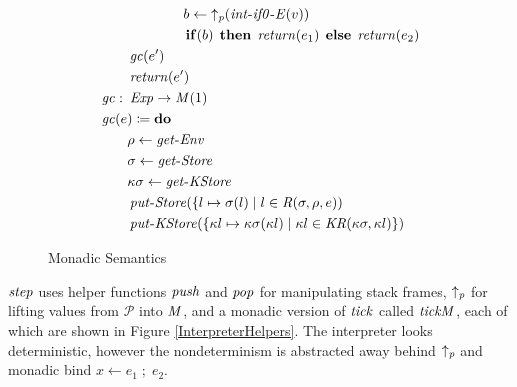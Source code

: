 \begin{figure}
\begin{align*}
&\hspace{6em} b  \leftarrow   \operatorname{\mathit{\uparrow_p}}  (\operatorname{\mathit{int-if0-E}}( v)) \\
&\hspace{6em}  \operatorname{\mathtt{\boldsymbol{\mathbf{if}}}}( b)  \;\operatorname{\mathtt{\boldsymbol{\mathbf{then}}}}\;   \operatorname{\mathit{return}}( e _1 )  \;\operatorname{\mathtt{\boldsymbol{\mathbf{else}}}}\;   \operatorname{\mathit{return}}( e _2 ) \\
&\hspace{2em}  \operatorname{\mathit{gc}}( e') \\
&\hspace{2em}  \operatorname{\mathit{return}}( e') \\
&\hspace{0em}  \operatorname{\mathit{gc}}   \mathbin{\colon}   \operatorname{\mathit{Exp}}   \rightarrow   \operatorname{\mathit{M}}( 1) \\
&\hspace{0em}  \operatorname{\mathit{gc}}( e)  \coloneqq   \operatorname{\mathtt{\boldsymbol{\mathbf{do}}}}  \\
&\hspace{2em}  \rho   \leftarrow   \operatorname{\mathit{get-Env}}  \\
&\hspace{2em}  \sigma   \leftarrow   \operatorname{\mathit{get-Store}}  \\
&\hspace{2em}  \kappa  \sigma   \leftarrow   \operatorname{\mathit{get-KStore}}  \\
&\hspace{2em}  \operatorname{\mathit{put-Store}}(  \{ l  \mapsto   \sigma (l)  \;|\;  l  \in   \operatorname{\mathit{R}}(  \sigma , \rho ,e)) \\
&\hspace{2em}  \operatorname{\mathit{put-KStore}}(  \{  \kappa l  \mapsto   \kappa  \sigma ( \kappa l)  \;|\;   \kappa l  \in   \operatorname{\mathit{KR}}(  \kappa  \sigma , \kappa l) \} )
\end{align*}\normalsize

\caption{Monadic Semantics}
\label{InterpreterStep}

\end{figure}

\par

$ \operatorname{\mathit{step}} $ uses helper functions $ \operatorname{\mathit{push}} $ and $ \operatorname{\mathit{pop}} $
for manipulating stack frames, $ \operatorname{\mathit{\uparrow_p}} $ for lifting values
from $ \mathcal{P} $ into $ \operatorname{\mathit{M}} $, and a monadic version of
$ \operatorname{\mathit{tick}} $ called $ \operatorname{\mathit{tickM}} $, each of which are shown in
Figure \ref{InterpreterHelpers}. The interpreter looks deterministic,
however the nondeterminism is abstracted away behind
$ \operatorname{\mathit{\uparrow_p}} $ and monadic bind
$x  \leftarrow  e _1   \;;\;  e _2 $.

\par

